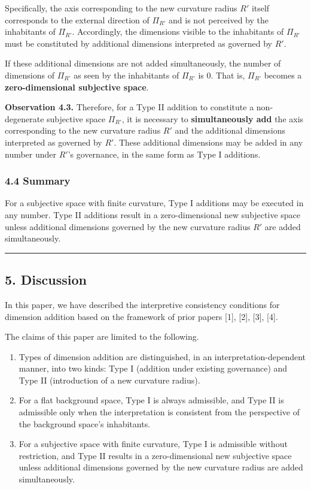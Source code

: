 \documentclass[a4paper,11pt]{article}
\theoremstyle{definition}
\providecommand{\tightlist}{\setlength{\itemsep}{0pt}\setlength{\parskip}{0pt}}
\begin{document}
Specifically, the axis corresponding to the new curvature radius \(R'\) itself corresponds to the external direction of \(\Pi_{R'}\) and is not perceived by the inhabitants of \(\Pi_{R'}\). Accordingly, the dimensions visible to the inhabitants of \(\Pi_{R'}\) must be constituted by additional dimensions interpreted as governed by \(R'\).

If these additional dimensions are not added simultaneously, the number of dimensions of \(\Pi_{R'}\) as seen by the inhabitants of \(\Pi_{R'}\) is \(0\). That is, \(\Pi_{R'}\) becomes a \textbf{zero-dimensional subjective space}.

\textbf{Observation 4.3.} Therefore, for a Type II addition to constitute a non-degenerate subjective space \(\Pi_{R'}\), it is necessary to \textbf{simultaneously add} the axis corresponding to the new curvature radius \(R'\) and the additional dimensions interpreted as governed by \(R'\). These additional dimensions may be added in any number under \(R'\)'s governance, in the same form as Type I additions.

\subsubsection{4.4 Summary}\label{summary-1}

For a subjective space with finite curvature, Type I additions may be executed in any number. Type II additions result in a zero-dimensional new subjective space unless additional dimensions governed by the new curvature radius \(R'\) are added simultaneously.

\begin{center}\rule{0.5\linewidth}{0.5pt}\end{center}

\subsection{5. Discussion}\label{discussion}

In this paper, we have described the interpretive consistency conditions for dimension addition based on the framework of prior papers {[}1{]}, {[}2{]}, {[}3{]}, {[}4{]}.

The claims of this paper are limited to the following.

\begin{enumerate}
\def\labelenumi{\arabic{enumi}.}
\tightlist
\item
  Types of dimension addition are distinguished, in an interpretation-dependent manner, into two kinds: Type I (addition under existing governance) and Type II (introduction of a new curvature radius).
\item
  For a flat background space, Type I is always admissible, and Type II is admissible only when the interpretation is consistent from the perspective of the background space's inhabitants.
\item
  For a subjective space with finite curvature, Type I is admissible without restriction, and Type II results in a zero-dimensional new subjective space unless additional dimensions governed by the new curvature radius are added simultaneously.
\end{enumerate}
\end{document}
